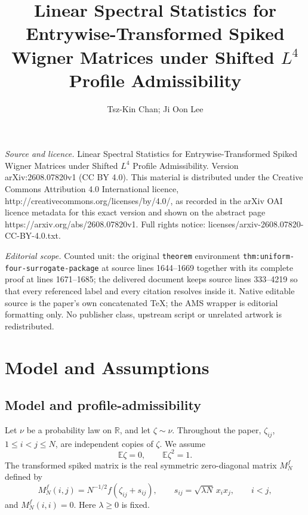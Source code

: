 \documentclass[10pt,a4paper]{amsart}
\newcommand{\E}{\mathbb E}
\newcommand{\R}{\mathbb R}
\begin{document}
\title[Linear Spectral Statistics for Entrywise-Transformed Spiked ]{Linear Spectral Statistics for Entrywise-Transformed Spiked Wigner Matrices under Shifted $L^4$ Profile Admissibility}
\author{Tsz-Kin Chan; Ji Oon Lee}
\date{}
\maketitle
\noindent\emph{Source and licence.} Linear Spectral Statistics for Entrywise-Transformed Spiked Wigner Matrices under Shifted $L^4$ Profile Admissibility. Version arXiv:2608.07820v1 (CC BY 4.0). This material is distributed under the Creative Commons Attribution 4.0 International licence, http://creativecommons.org/licenses/by/4.0/, as recorded in the arXiv OAI licence metadata for this exact version and shown on the abstract page https://arxiv.org/abs/2608.07820v1. Full rights notice: licenses/arxiv-2608.07820-CC-BY-4.0.txt.\par\smallskip
\noindent\textit{Editorial scope.} Counted unit: the original \texttt{theorem} environment \texttt{thm:uniform-four-surrogate-package} at source lines 1644--1669 together with its complete proof at lines 1671--1685; the delivered document keeps source lines 333--4219 so that every referenced label and every citation resolves inside it. Native editable source is the paper's own concatenated TeX; the AMS wrapper is editorial formatting only. No publisher class, upstream script or unrelated artwork is redistributed.
\section{Model and Assumptions}\label{sec:model-main}

\subsection{Model and profile-admissibility}

Let \(\nu\) be a probability law on \(\R\), and let \(\zeta\sim\nu\).  Throughout the paper, \(\zeta_{ij}\), \(1\le i<j\le N\), are independent copies of \(\zeta\).  We assume
\[
        \E\zeta=0,
        \qquad
        \E\zeta^2=1.
\]
The transformed spiked matrix is the real symmetric zero-diagonal matrix \(M_N^f\) defined by
\begin{equation}\label{eq:model}
        M_N^f(i,j)=N^{-1/2}f(\zeta_{ij}+s_{ij}),
        \qquad
        s_{ij}=\sqrt{\lambda N}\,x_i x_j,
        \qquad i<j,
\end{equation}
and \(M_N^f(i,i)=0\).  Here \(\lambda\ge0\) is fixed.
\end{document}
